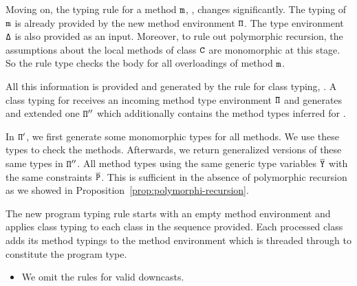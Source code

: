 

Moving on, the typing rule for a method ${\tt m}$, , changes
significantly. The typing of ${\tt m}$ is already provided by the new
method environment ${\tt \Pi}$.  The type environment ${\tt \Delta}$ is
also provided as an input. Moreover, to rule out polymorphic
recursion, the assumptions about the local methods of class ${\tt C}$
are monomorphic at this stage. So the rule type checks the body for
all overloadings of method ${\tt m}$.

All this information is provided and generated by the rule for class
typing, . A class typing for  receives an incoming
method type environment ${\tt \Pi}$ and generates and extended one
${\tt \Pi''}$ which additionally contains the method types inferred for
.

In ${\tt \Pi'}$, we first generate some monomorphic types for all
methods. We use these types to check the methods. Afterwards, we
return generalized versions of these same types in ${\tt \Pi''}$. All
method types using the same generic type variables $\overline{\tt Y}$ with the
same constraints $\overline{\tt P}$. This is sufficient in the absence of
polymorphic recursion as we showed in
Proposition~\ref{prop:polymorphi-recursion}.

The new program typing rule  starts with an empty
method environment and applies class typing to each class in the
sequence provided. Each processed class adds its method typings to the method
environment which is threaded through to constitute the program type. 

\begin{itemize}
\item We omit the rules for valid downcasts.



\end{itemize}
\fi

